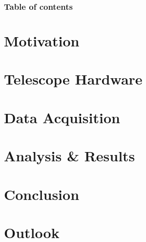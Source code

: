 \documentclass[9pt]{beamer}
\begin{document}


\begin{frame}%
	\frametitle{Table of contents}
	\tableofcontents[hideallsubsections]   %
\end{frame}

\section{Motivation}



\section{Telescope Hardware}


\section{Data Acquisition}


\section{Analysis \& Results}


\section{Conclusion}


\section{Outlook}


% 

\end{document}
